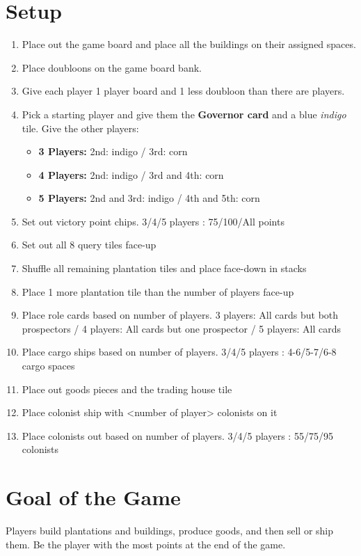 \documentclass[12pt]{article}
\newenvironment{enumerateCustom}
{\begin{enumerate}
  \setlength{\itemsep}{1pt}
  \setlength{\parskip}{0pt}
  \setlength{\parsep}{0pt}}
{\end{enumerate}}
\newenvironment{itemizeCustom}
{\begin{itemize}
  \setlength{\itemsep}{1pt}
  \setlength{\parskip}{0pt}
  \setlength{\parsep}{0pt}}
{\end{itemize}}
\begin{document}
\begin{multicols*}{2}

\section*{Setup}
\begin{enumerateCustom}
	\item Place out the game board and place all the buildings on their assigned spaces.
	\item Place doubloons on the game board bank.
	\item Give each player 1 player board and 1 less doubloon than there are players.
	\item Pick a starting player and give them the \textbf{Governor card} and a blue \emph{indigo} tile. Give the other players:
		\begin{itemizeCustom}
			\item \textbf{3 Players:} 2nd: indigo / 3rd: corn
			\item \textbf{4 Players:} 2nd: indigo / 3rd and 4th: corn
			\item \textbf{5 Players:} 2nd and 3rd: indigo / 4th and 5th: corn
		\end{itemizeCustom}
	\item Set out victory point chips. 3/4/5 players : 75/100/All points
	\item Set out all 8 query tiles face-up
	\item Shuffle all remaining plantation tiles and place face-down in stacks
	\item Place 1 more plantation tile than the number of players face-up
	\item Place role cards based on number of players. 3 players: All cards but both prospectors / 4 players: All cards but one prospector / 5 players: All cards
	\item Place cargo ships based on number of players. 3/4/5 players : 4-6/5-7/6-8 cargo spaces
	\item Place out goods pieces and the trading house tile
	\item Place colonist ship with <number of player> colonists on it
	\item Place colonists out based on number of players. 3/4/5 players : 55/75/95 colonists
\end{enumerateCustom}

\section*{Goal of the Game}
Players build plantations and buildings, produce goods, and then sell or ship them. Be the player with the most points at the end of the game.


\end{multicols*}
\end{document}

